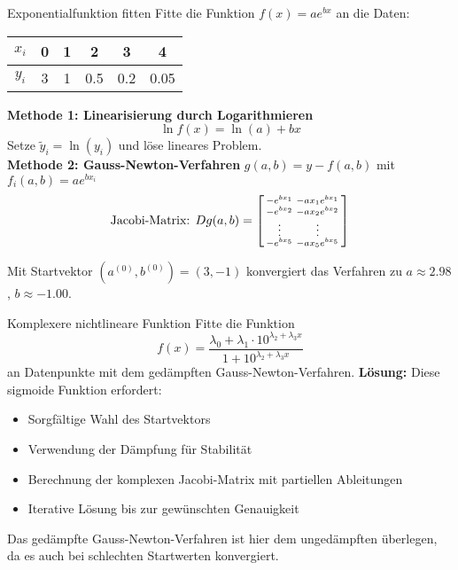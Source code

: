 \begin{example2}{Exponentialfunktion fitten} Fitte die Funktion $f(x) = ae^{bx}$ an die Daten:
\begin{center}
\begin{tabular}{|c|c|c|c|c|c|}
\hline
$x_i$ & 0 & 1 & 2 & 3 & 4 \\
\hline
$y_i$ & 3 & 1 & 0.5 & 0.2 & 0.05 \\
\hline
\end{tabular}
\end{center}

\textbf{Methode 1: Linearisierung durch Logarithmieren}
$$\ln f(x) = \ln(a) + bx$$
Setze $\tilde{y}_i = \ln(y_i)$ und löse lineares Problem.
\vspace{2mm}\\
\textbf{Methode 2: Gauss-Newton-Verfahren}
$g(a,b) = y - f(a,b)$ mit $f_i(a,b) = ae^{bx_i}$
$$\text{Jacobi-Matrix: } Dg(a,b) = \begin{bsmallmatrix}
-e^{bx_1} & -ax_1 e^{bx_1} \\
-e^{bx_2} & -ax_2 e^{bx_2} \\
\vdots & \vdots \\
-e^{bx_5} & -ax_5 e^{bx_5}
\end{bsmallmatrix}$$

Mit Startvektor $(a^{(0)}, b^{(0)}) = (3, -1)$ konvergiert das Verfahren zu $a \approx 2.98$, $b \approx -1.00$.
\end{example2}

\begin{example2}{Komplexere nichtlineare Funktion} Fitte die Funktion 
$$f(x) = \frac{\lambda_0 + \lambda_1 \cdot 10^{\lambda_2 + \lambda_3 x}}{1 + 10^{\lambda_2 + \lambda_3 x}}$$
an Datenpunkte mit dem gedämpften Gauss-Newton-Verfahren.
\tcblower
\textbf{Lösung:}
Diese sigmoide Funktion erfordert:
\begin{itemize}
    \item Sorgfältige Wahl des Startvektors
    \item Verwendung der Dämpfung für Stabilität
    \item Berechnung der komplexen Jacobi-Matrix mit partiellen Ableitungen
    \item Iterative Lösung bis zur gewünschten Genauigkeit
\end{itemize}

Das gedämpfte Gauss-Newton-Verfahren ist hier dem ungedämpften überlegen, da es auch bei schlechten Startwerten konvergiert.
\end{example2}


